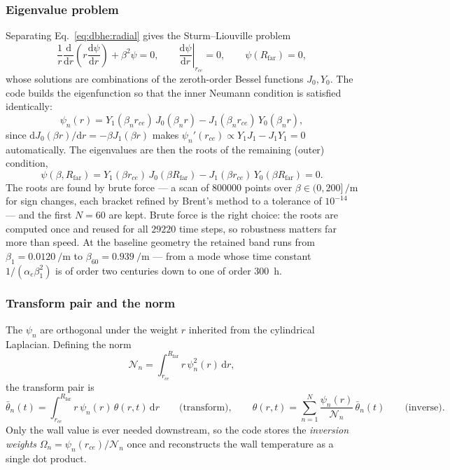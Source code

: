 \subsubsection{Eigenvalue problem}
Separating Eq.~\eqref{eq:dbhe:radial} gives the Sturm--Liouville problem
\begin{equation}
\frac{1}{r}\frac{\mathrm{d}}{\mathrm{d}r}\!\left(r\frac{\mathrm{d}\psi}{\mathrm{d}r}\right)
+\beta^{2}\psi=0, \qquad \left.\frac{\mathrm{d}\psi}{\mathrm{d}r}\right|_{r_{ce}}=0, \qquad
\psi(R_{\mathrm{far}})=0 ,
\label{eq:dbhe:SL}
\end{equation}
whose solutions are combinations of the zeroth-order Bessel functions $J_0,Y_0$.
The code builds the eigenfunction so that the inner Neumann condition is
satisfied identically:
\begin{equation}
\psi_n(r)=Y_1(\beta_n r_{ce})\,J_0(\beta_n r)-J_1(\beta_n r_{ce})\,Y_0(\beta_n r),
\label{eq:dbhe:psi}
\end{equation}
since $\mathrm{d}J_0(\beta r)/\mathrm{d}r=-\beta J_1(\beta r)$ makes
$\psi_n'(r_{ce})\propto Y_1 J_1-J_1 Y_1=0$ automatically. The eigenvalues are
then the roots of the remaining (outer) condition,
\begin{equation}
\psi(\beta,R_{\mathrm{far}}) =Y_1(\beta r_{ce})\,J_0(\beta R_{\mathrm{far}}) -J_1(\beta
r_{ce})\,Y_0(\beta R_{\mathrm{far}})=0 .
\label{eq:dbhe:chareq}
\end{equation}
The roots are found by brute force --- a scan of $\num{800000}$ points over
$\beta\in(0,200]\,\si{\per\metre}$ for sign changes, each bracket refined by
Brent's method to a tolerance of $10^{-14}$ --- and the first $N=60$ are kept.
Brute force is the right choice: the roots are computed once and reused for all
$\num{29220}$ time steps, so robustness matters far more than speed. At the
baseline geometry the retained band runs from
$\beta_1=\SI{0.0120}{\per\metre}$ to $\beta_{60}=\SI{0.939}{\per\metre}$ --- from
a mode whose time constant $1/(\alpha_e\beta_1^2)$ is of order two centuries
down to one of order \SI{300}{\hour}.

\subsubsection{Transform pair and the norm}
The $\psi_n$ are orthogonal under the weight $r$ inherited from the cylindrical
Laplacian. Defining the norm
\begin{equation}
\mathcal{N}_n=\int_{r_{ce}}^{R_{\mathrm{far}}} r\,\psi_n^2(r)\,\mathrm{d}r ,
\label{eq:dbhe:norm}
\end{equation}
the transform pair is
\begin{equation}
\bar\theta_n(t)=\int_{r_{ce}}^{R_{\mathrm{far}}} r\,\psi_n(r)\,\theta(r,t)\,\mathrm{d}r
\qquad\text{(transform)}, \qquad
\theta(r,t)=\sum_{n=1}^{N}\frac{\psi_n(r)}{\mathcal{N}_n}\,\bar\theta_n(t)
\qquad\text{(inverse)} .
\label{eq:dbhe:pair}
\end{equation}
Only the wall value is ever needed downstream, so the code stores the
\emph{inversion weights} $\Omega_n=\psi_n(r_{ce})/\mathcal{N}_n$ once and
reconstructs the wall temperature as a single dot product.

